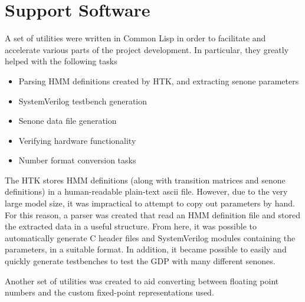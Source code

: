 



\section{Support Software} %
\label{sec:support_software}
	A set of utilities were written in Common Lisp in order to facilitate and accelerate various parts of the project development.  In particular, they greatly helped with the following tasks
	\begin{itemize}
		\item Parsing HMM definitions created by HTK, and extracting senone parameters
		\item SystemVerilog testbench generation
		\item Senone data file generation
		\item Verifying hardware functionality
		\item Number format conversion tasks
	\end{itemize}

	The HTK stores HMM definitions (along with transition matrices and senone definitions) in a human-readable plain-text ascii file.  However, due to the very large model size, it was impractical to attempt to copy out parameters by hand.  For this reason, a parser was created that read an HMM definition file and stored the extracted data in a useful structure.  From here, it was possible to automatically generate C header files and SystemVerilog modules containing the parameters, in a suitable format.  In addition, it became possible to easily and quickly generate testbenches to test the GDP with many different senones.

	Another set of utilities was created to aid converting between floating point numbers and the custom fixed-point representations used.

